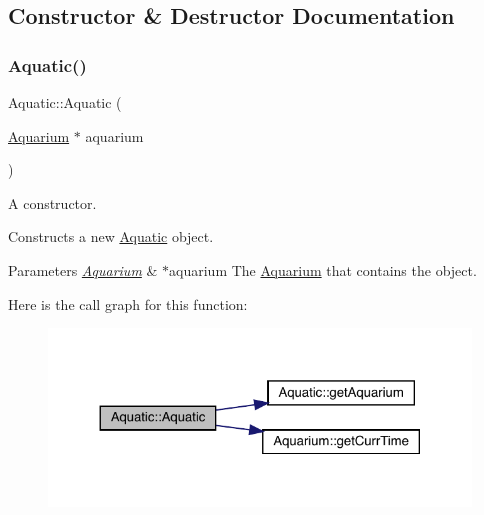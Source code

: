\subsection{Constructor \& Destructor Documentation}
\mbox{\label{class_aquatic_a302075a7330fcdf17dc0fc50ae62ada8}} 
\subsubsection{\texorpdfstring{Aquatic()}{Aquatic()}\hspace{0.1cm}{\footnotesize\ttfamily [1/2]}}
{\footnotesize\ttfamily Aquatic\+::\+Aquatic (\begin{DoxyParamCaption}\item[{\mbox{\hyperlink{class_aquarium}{Aquarium}} $\ast$}]{aquarium }\end{DoxyParamCaption})}



A constructor. 

Constructs a new \mbox{\hyperlink{class_aquatic}{Aquatic}} object. 
\begin{DoxyParams}{Parameters}
{\em \mbox{\hyperlink{class_aquarium}{Aquarium}}} & $\ast$aquarium The \mbox{\hyperlink{class_aquarium}{Aquarium}} that contains the object. \\
\hline
\end{DoxyParams}
Here is the call graph for this function\+:\nopagebreak
\begin{figure}[H]
\begin{center}
\leavevmode
\includegraphics[width=324pt]{class_aquatic_a302075a7330fcdf17dc0fc50ae62ada8_cgraph}
\end{center}
\end{figure}
\mbox{\label{class_aquatic_a01426b7729415006ede2c6238fc5849e}} 

